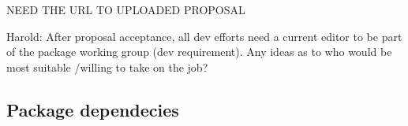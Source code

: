 NEED THE URL TO UPLOADED PROPOSAL

{\color{red} Harold: \notice After proposal acceptance, all dev efforts need a current editor to be part of the package working group (dev requirement). Any ideas as to who would be most suitable /willing to take on the job?}





\subsection{Package dependecies}
\label{subsec:dependencies}

